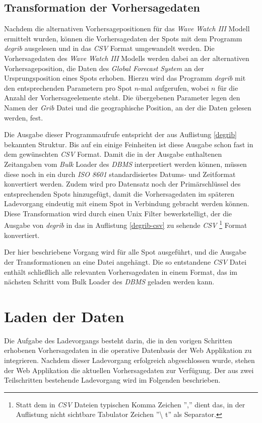 \subsection{Transformation der Vorhersagedaten}
Nachdem die alternativen Vorhersagepositionen für das \textit{Wave
  Watch III} Modell ermittelt wurden, können die Vorhersagedaten der
Spots mit dem Programm \textit{degrib} ausgelesen und in das
\textit{CSV} Format umgewandelt werden. Die Vorhersagedaten des
\textit{Wave Watch III} Modells werden dabei an der alternativen
Vorhersageposition, die Daten des \textit{Global Forecast System} an
der Ursprungsposition eines Spots erhoben. Hierzu wird das Programm
\textit{degrib} mit den entsprechenden Parametern pro Spot $n$-mal
aufgerufen, wobei $n$ für die Anzahl der Vorhersageelemente steht. Die
übergebenen Parameter legen den Namen der \textit{Grib} Datei und die
geographische Position, an der die Daten gelesen werden, fest.

Die Ausgabe dieser Programmaufrufe entspricht der aus Auflistung
\ref{degrib} bekannten Struktur. Bis auf ein einige Feinheiten ist
diese Ausgabe schon fast in dem gewünschten \textit{CSV} Format. Damit
die in der Ausgabe enthaltenen Zeitangaben vom \textit{Bulk} Loader
des \textit{DBMS} interpretiert werden können, müssen diese noch in
ein durch \textit{ISO 8601} standardisiertes Datums- und Zeitformat
konvertiert werden. Zudem wird pro Datensatz noch der Primärschlüssel
des entsprechenden Spots hinzugefügt, damit die Vorhersagedaten im
späteren Ladevorgang eindeutig mit einem Spot in Verbindung gebracht
werden können. Diese Transformation wird durch einen Unix Filter
bewerkstelligt, der die Ausgabe von \textit{degrib} in das in
Auflistung \ref{degrib-csv} zu sehende \textit{CSV} \footnote{Statt
  dem in \textit{CSV} Dateien typischen Komma Zeichen '','' dient das,
  in der Auflistung nicht sichtbare Tabulator Zeichen ''\textbackslash
  t'' als Separator.} Format konvertiert.



Der hier beschriebene Vorgang wird für alle Spot ausgeführt, und die
Ausgabe der Transformationen an eine Datei angehängt. Die so
entstandene \textit{CSV} Datei enthält schließlich alle relevanten
Vorhersagedaten in einem Format, das im nächsten Schritt vom Bulk
Loader des \textit{DBMS} geladen werden kann.

\section{Laden der Daten}
Die Aufgabe des Ladevorgangs besteht darin, die in den vorigen
Schritten erhobenen Vorhersagedaten in die operative Datenbasis der
Web Applikation zu integrieren. Nachdem dieser Ladevorgang erfolgreich
abgeschlossen wurde, stehen der Web Applikation die aktuellen
Vorhersagedaten zur Verfügung. Der aus zwei Teilschritten bestehende
Ladevorgang wird im Folgenden beschrieben.

